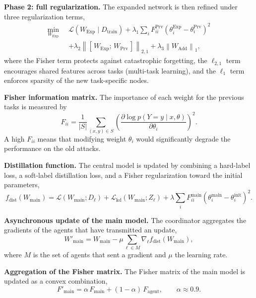 \documentclass[11pt,a4paper]{article}
\begin{document}
\textbf{Phase 2: full regularization.} The expanded network is then refined under three regularization terms,
\begin{equation}
\begin{aligned}
\min_{W_{\mathrm{Exp}}} \;\; & \mathcal{L}\!\left(W_{\mathrm{Exp}} \mid D_{\mathrm{train}}\right)
+ \lambda_1 \sum_i F^{\mathrm{Prv}}_{ii}\left(\theta^{\mathrm{Exp}}_i - \theta^{\mathrm{Prv}}_i\right)^2 \\[2pt]
& + \lambda_2 \left\lVert [\,W_{\mathrm{Exp}};\, W_{\mathrm{Prv}}\,] \right\rVert_{2,1}
+ \lambda_3 \left\lVert W_{\mathrm{Add}} \right\rVert_1 ,
\end{aligned}
\end{equation}
where the Fisher term protects against catastrophic forgetting, the $\ell_{2,1}$ term encourages shared features across tasks (multi-task learning), and the $\ell_1$ term enforces sparsity of the new task-specific nodes.

\textbf{Fisher information matrix.} The importance of each weight for the previous tasks is measured by
\begin{equation}
F_{ii} = \frac{1}{|S|} \sum_{(x,y)\in S} \left( \frac{\partial \log p(Y=y \mid x,\theta)}{\partial \theta_i} \right)^{2}.
\end{equation}
A high $F_{ii}$ means that modifying weight $\theta_i$ would significantly degrade the performance on the old attacks.

\textbf{Distillation function.} The central model is updated by combining a hard-label loss, a soft-label distillation loss, and a Fisher regularization toward the initial parameters,
\begin{equation}
f_{\mathrm{dist}}(W_{\mathrm{main}}) = \mathcal{L}(W_{\mathrm{main}}; D_\ell) + \mathcal{L}_{\mathrm{kd}}(W_{\mathrm{main}}; Z_\ell) + \lambda \sum_i F^{\mathrm{main}}_{ii}\left(\theta^{\mathrm{main}}_i - \theta^{\mathrm{init}}_i\right)^{2}.
\end{equation}

\textbf{Asynchronous update of the main model.} The coordinator aggregates the gradients of the agents that have transmitted an update,
\begin{equation}
W'_{\mathrm{main}} = W_{\mathrm{main}} - \mu \sum_{\ell \in M} \nabla_\ell f_{\mathrm{dist}}(W_{\mathrm{main}}),
\end{equation}
where $M$ is the set of agents that sent a gradient and $\mu$ the learning rate.

\textbf{Aggregation of the Fisher matrix.} The Fisher matrix of the main model is updated as a convex combination,
\begin{equation}
F'_{\mathrm{main}} = \alpha\, F_{\mathrm{main}} + (1-\alpha)\, F_{\mathrm{agent}}, \qquad \alpha \approx 0.9 .
\end{equation}
\end{document}

